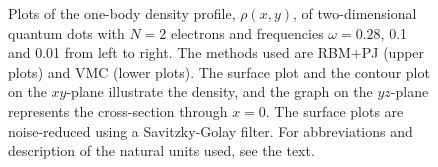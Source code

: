\begin{figure}
	\hspace{0.1cm}
	\hspace{-0.cm}
	\hspace{-0.cm}
	
	\caption{Plots of the one-body density profile, $\rho(x, y)$, of two-dimensional quantum dots with $N=2$ electrons and frequencies $\omega=0.28$, 0.1 and 0.01 from left to right. The methods used are RBM+PJ (upper plots) and VMC (lower plots). The surface plot and the contour plot on the $xy$-plane illustrate the density, and the graph on the $yz$-plane represents the cross-section through $x=0$. The surface plots are noise-reduced using a Savitzky-Golay filter. For  abbreviations and description of the natural units used, see the text.}
	\label{fig:lowfreq2P}
\end{figure}

